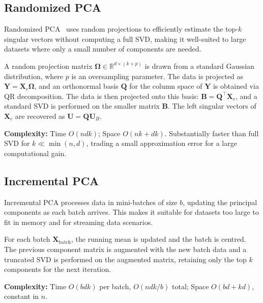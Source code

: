 \subsection{Randomized PCA}

Randomized PCA~\citep{halko2011finding} uses random projections to efficiently
estimate the top-$k$ singular vectors without computing a full SVD, making it
well-suited to large datasets where only a small number of components are
needed.

A random projection matrix $\boldsymbol{\Omega} \in \mathbb{R}^{d \times
(k+p)}$ is drawn from a standard Gaussian distribution, where $p$ is an
oversampling parameter. The data is projected as
$\mathbf{Y} = \mathbf{X}_c \boldsymbol{\Omega}$, and an orthonormal basis
$\mathbf{Q}$ for the column space of $\mathbf{Y}$ is obtained via QR
decomposition. The data is then projected onto this basis:
$\mathbf{B} = \mathbf{Q}^\top \mathbf{X}_c$, and a standard SVD is performed
on the smaller matrix $\mathbf{B}$. The left singular vectors of $\mathbf{X}_c$
are recovered as $\mathbf{U} = \mathbf{Q}\mathbf{U}_B$.

\textbf{Complexity:} Time $O(ndk)$; Space $O(nk + dk)$. Substantially faster
than full SVD for $k \ll \min(n, d)$, trading a small approximation error for
a large computational gain.

\subsection{Incremental PCA}

Incremental PCA processes data in mini-batches of size $b$, updating the
principal components as each batch arrives. This makes it suitable for
datasets too large to fit in memory and for streaming data scenarios.

For each batch $\mathbf{X}_{\text{batch}}$, the running mean is updated and
the batch is centred. The previous component matrix is augmented with the new
batch data and a truncated SVD is performed on the augmented matrix, retaining
only the top $k$ components for the next iteration.

\textbf{Complexity:} Time $O(bdk)$ per batch, $O(ndk/b)$ total; Space
$O(bd + kd)$, constant in $n$.

